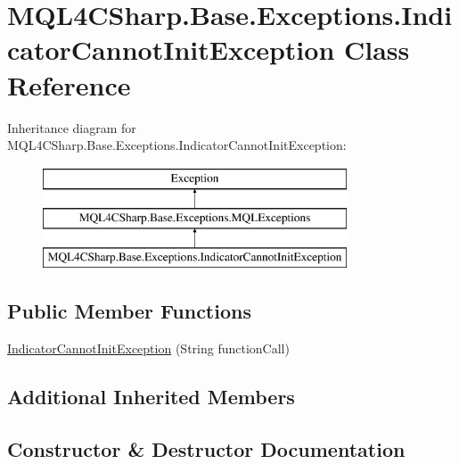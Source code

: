 \hypertarget{class_m_q_l4_c_sharp_1_1_base_1_1_exceptions_1_1_indicator_cannot_init_exception}{}\section{M\+Q\+L4\+C\+Sharp.\+Base.\+Exceptions.\+Indicator\+Cannot\+Init\+Exception Class Reference}
\label{class_m_q_l4_c_sharp_1_1_base_1_1_exceptions_1_1_indicator_cannot_init_exception}
Inheritance diagram for M\+Q\+L4\+C\+Sharp.\+Base.\+Exceptions.\+Indicator\+Cannot\+Init\+Exception\+:\begin{figure}[H]
\begin{center}
\leavevmode
\includegraphics[height=3.000000cm]{class_m_q_l4_c_sharp_1_1_base_1_1_exceptions_1_1_indicator_cannot_init_exception}
\end{center}
\end{figure}
\subsection*{Public Member Functions}
\begin{DoxyCompactItemize}
\item 
\hyperlink{class_m_q_l4_c_sharp_1_1_base_1_1_exceptions_1_1_indicator_cannot_init_exception_a934b6bb2e1bf3fb4c9874b56a4d887a6}{Indicator\+Cannot\+Init\+Exception} (String function\+Call)
\end{DoxyCompactItemize}
\subsection*{Additional Inherited Members}


\subsection{Constructor \& Destructor Documentation}
